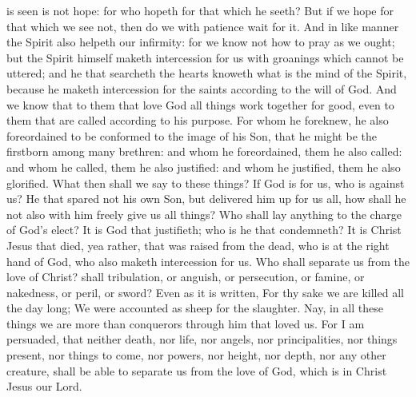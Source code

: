 is seen is not hope: for who hopeth for that which he seeth? But if we hope for that which we see not, then do we with patience wait for it.  And in like manner the Spirit also helpeth our infirmity: for we know not how to pray as we ought; but the Spirit himself maketh intercession for us with groanings which cannot be uttered; and he that searcheth the hearts knoweth what is the mind of the Spirit, because he maketh intercession for the saints according to the will of God. And we know that to them that love God all things work together for good, even to them that are called according to his purpose. For whom he foreknew, he also foreordained to be conformed to the image of his Son, that he might be the firstborn among many brethren: and whom he foreordained, them he also called: and whom he called, them he also justified: and whom he justified, them he also glorified.  What then shall we say to these things? If God is for us, who is against us? He that spared not his own Son, but delivered him up for us all, how shall he not also with him freely give us all things? Who shall lay anything to the charge of God’s elect? It is God that justifieth; who is he that condemneth? It is Christ Jesus that died, yea rather, that was raised from the dead, who is at the right hand of God, who also maketh intercession for us. Who shall separate us from the love of Christ? shall tribulation, or anguish, or persecution, or famine, or nakedness, or peril, or sword? Even as it is written, For thy sake we are killed all the day long; We were accounted as sheep for the slaughter.  Nay, in all these things we are more than conquerors through him that loved us. For I am persuaded, that neither death, nor life, nor angels, nor principalities, nor things present, nor things to come, nor powers, nor height, nor depth, nor any other creature, shall be able to separate us from the love of God, which is in Christ Jesus our Lord. 

